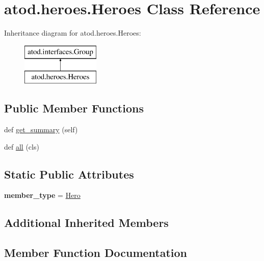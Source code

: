 \hypertarget{classatod_1_1heroes_1_1_heroes}{}\section{atod.\+heroes.\+Heroes Class Reference}
\label{classatod_1_1heroes_1_1_heroes}
Inheritance diagram for atod.\+heroes.\+Heroes\+:\begin{figure}[H]
\begin{center}
\leavevmode
\includegraphics[height=2.000000cm]{classatod_1_1heroes_1_1_heroes}
\end{center}
\end{figure}
\subsection*{Public Member Functions}
\begin{DoxyCompactItemize}
\item 
def \hyperlink{classatod_1_1heroes_1_1_heroes_ab33167d6a3af098c9e055a83e271fc7f}{get\+\_\+summary} (self)
\item 
def \hyperlink{classatod_1_1heroes_1_1_heroes_a71cda232697372e876599e2a51df5b23}{all} (cls)
\end{DoxyCompactItemize}
\subsection*{Static Public Attributes}
\begin{DoxyCompactItemize}
\item 
{\bfseries member\+\_\+type} = \hyperlink{classatod_1_1heroes_1_1_hero}{Hero}\hypertarget{classatod_1_1heroes_1_1_heroes_a91f57a9b49cf151cb96af681f0798d19}{}\label{classatod_1_1heroes_1_1_heroes_a91f57a9b49cf151cb96af681f0798d19}

\end{DoxyCompactItemize}
\subsection*{Additional Inherited Members}


\subsection{Member Function Documentation}
